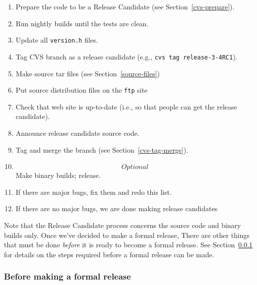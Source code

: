 \documentclass{dods-paper}
\begin{document}
\begin{enumerate}

\item Prepare the code to be a Release Candidate (see
  Section~\ref{cvs-prepare}). 
\item Run nightly builds until the tests are clean.
\item Update all \texttt{version.h} files.
\item Tag CVS branch as a release candidate (e.g., \texttt{cvs tag
  release-3-4RC1}).
\item Make source tar files (see Section~\ref{source-files})
\item Put source distribution files on the \texttt{ftp} site
\item Check that web site is up-to-date (i.e., so that people can get the
  release candidate).
\item Announce release candidate source code.
\item Tag and merge the branch (see Section~\ref{cvs-tag-merge}).
\item \[Optional\] Make binary builds; release.
\item If there are major bugs, fix them and redo this list.
\item If there are no major bugs, we are done making release candidates

\end{enumerate}

Note that the Release Candidate process concerns the source code and binary
builds only. Once we've decided to make a formal release, There are other
things that must be done {\em before} it is ready to become a formal
release. See Section~\ref{full-release} for details on the steps
required before a formal release can be made.

\subsubsection{Before making a formal release}
\label{full-release}
\end{document}
